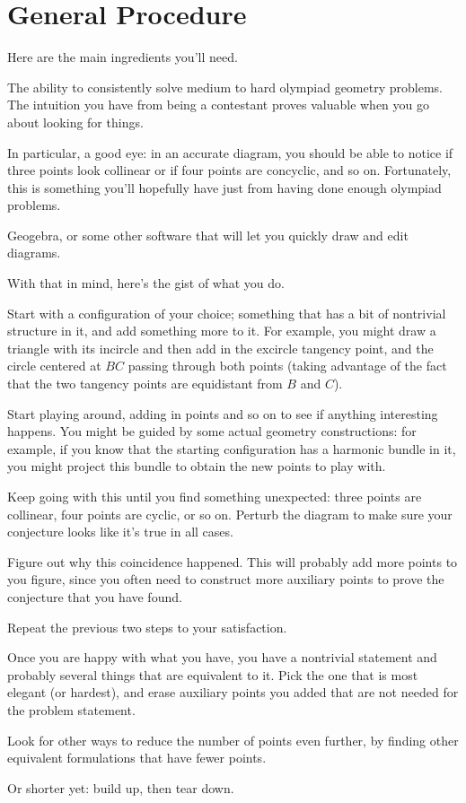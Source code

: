 \documentclass[11pt]{scrartcl}
\begin{document}
\section{General Procedure}
Here are the main ingredients you'll need.
\begin{itemize}
  \ii The ability to consistently solve medium to hard
  olympiad geometry problems. The intuition you have from being
  a contestant proves valuable when you go about looking for things.

  \ii In particular, a good eye:
  in an accurate diagram, you should be able to notice
  if three points look collinear or if four points are concyclic,
  and so on. Fortunately, this is something you'll hopefully have
  just from having done enough olympiad problems.

  \ii Geogebra, or some other software that will let you quickly
  draw and edit diagrams.
\end{itemize}

With that in mind, here's the gist of what you do.
\begin{enumerate}
  \ii Start with a configuration of your choice;
  something that has a bit of nontrivial structure in it,
  and add something more to it.
  For example, you might draw a triangle with its incircle
  and then add in the excircle tangency point,
  and the circle centered at $BC$ passing through both points
  (taking advantage of the fact that the two tangency points
  are equidistant from $B$ and $C$).

  \ii Start playing around, adding in points and so on
  to see if anything interesting happens.
  You might be guided by some actual geometry constructions:
  for example, if you know that the starting configuration
  has a harmonic bundle in it,
  you might project this bundle to obtain the new points to play with.

  \ii Keep going with this until you find something unexpected:
  three points are collinear, four points are cyclic, or so on.
  Perturb the diagram to make sure your conjecture looks like
  it's true in all cases.

  \ii Figure out why this coincidence happened.
  This will probably add more points to you figure,
  since you often need to construct more auxiliary points
  to prove the conjecture that you have found.

  \ii Repeat the previous two steps to your satisfaction.

  \ii Once you are happy with what you have,
  you have a nontrivial statement and probably
  several things that are equivalent to it.
  Pick the one that is most elegant (or hardest), and erase
  auxiliary points you added that are not needed for the
  problem statement.

  \ii Look for other ways to reduce the number of points
  even further, by finding other equivalent formulations
  that have fewer points.
\end{enumerate}
Or shorter yet: build up, then tear down.
\end{document}
